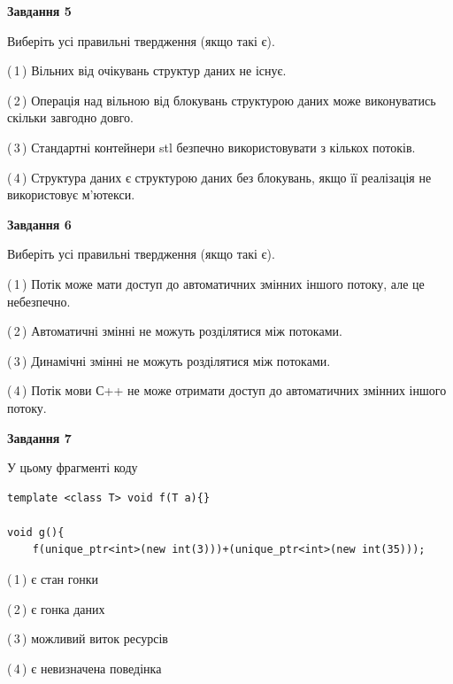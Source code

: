\documentclass[12pt, ukrainian]{article}
\begin{document}
\begin {large}
{\begin{center}
\textbf{Завдання 5}
\end{center}

Виберіть усі правильні твердження (якщо такі є).\par
\vspace{2mm}

(\,1\,) Вільних від очікувань структур даних не існує.%

(\,2\,) Операція над вільною від блокувань структурою даних може виконуватись скільки завгодно довго.%

(\,3\,) Стандартні контейнери stl безпечно використовувати з кількох потоків.%

(\,4\,) Структура даних є структурою даних без блокувань, якщо її реалізація не використовує м’ютекси.%
\newpage


\begin{center}
\textbf{Завдання 6}
\end{center}

Виберіть усі правильні твердження (якщо такі є).\par
\vspace{2mm}

(\,1\,) Потік може мати доступ до автоматичних змінних іншого потоку, але це небезпечно.%

(\,2\,) Автоматичні змінні не можуть розділятися між потоками.%

(\,3\,) Динамічні змінні не можуть розділятися між потоками.%

(\,4\,) Потік мови С++ не може отримати доступ до автоматичних змінних іншого потоку.%


\begin{center}
\textbf{Завдання 7}
\end{center}

У цьому фрагменті коду
\begin{verbatim}
template <class T> void f(T a){}

void g(){
    f(unique_ptr<int>(new int(3)))+(unique_ptr<int>(new int(35)));
\end{verbatim}

(\,1\,) є стан гонки%

(\,2\,) є гонка даних%

(\,3\,) можливий виток ресурсів%

(\,4\,) є невизначена поведінка%

}
\end {large}

\vspace{4mm}
\newpage
\end{document}

